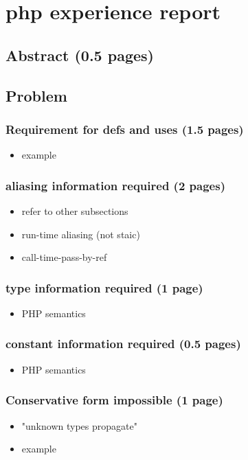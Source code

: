 \chapter{php experience report }


\section{Abstract (0.5 pages)}

\section{Problem}

\subsection{Requirement for defs and uses (1.5 pages)}
\begin{itemize}
	\item example
\end{itemize}

\subsection{aliasing information required (2 pages)}
\begin{itemize}
	\item refer to other subsections
	\item run-time aliasing (not staic)
	\item call-time-pass-by-ref
\end{itemize}

\subsection{type information required (1 page)}
\begin{itemize}
	\item PHP semantics
\end{itemize}

\subsection{constant information required (0.5 pages)}
\begin{itemize}
	\item PHP semantics
\end{itemize}

\subsection{Conservative form impossible (1 page)}
\begin{itemize}
	\item "unknown types propagate"
	\item example
\end{itemize}

